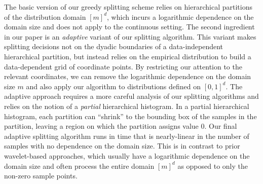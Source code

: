 \documentclass[final,12pt]{colt2018} %
\begin{document}
The basic version of our greedy splitting scheme relies on hierarchical partitions of the distribution domain $[m]^d$, which incurs a logarithmic dependence on the domain size and does not apply to the continuous setting.
The second ingredient in our paper is an \emph{adaptive} variant of our splitting algorithm.
This variant makes splitting decisions not on the dyadic boundaries of a data-independent hierarchical partition, but instead relies on the empirical distribution to build a data-dependent grid of coordinate points.
By restricting our attention to the relevant coordinates, we can remove the logarithmic dependence on the domain size $m$ and also apply our algorithm to distributions defined on $[0,1]^d$.
The adaptive approach requires a more careful analysis of our splitting algorithms and relies on the notion of a \emph{partial} hierarchical histogram.
In a partial hierarchical histogram, each partition can ``shrink'' to the bounding box of the samples in the partition, leaving a region on which the partition assigns value 0.
Our final adaptive splitting algorithm runs in time that is nearly-linear in the number of samples with no dependence on the domain size.
This is in contrast to prior wavelet-based approaches, which usually have a logarithmic dependence on the domain size and often process the entire domain $[m]^d$ as opposed to only the non-zero sample points.
\end{document}
